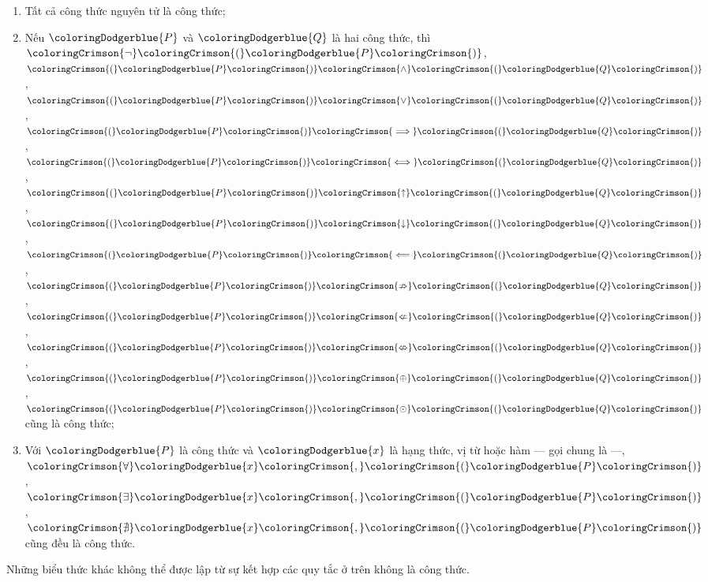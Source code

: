 \begin{enumerate}
   \item Tất cả công thức nguyên tử là công thức;
   \item Nếu $\coloringDodgerblue{P}$ và $\coloringDodgerblue{Q}$ là hai công thức, thì 
      $\coloringCrimson{\neg}\coloringCrimson{(}\coloringDodgerblue{P}\coloringCrimson{)}$, 
      $\coloringCrimson{(}\coloringDodgerblue{P}\coloringCrimson{)} \coloringCrimson{\land} \coloringCrimson{(}\coloringDodgerblue{Q}\coloringCrimson{)}$, 
      $\coloringCrimson{(}\coloringDodgerblue{P}\coloringCrimson{)} \coloringCrimson{\lor} \coloringCrimson{(}\coloringDodgerblue{Q}\coloringCrimson{)}$, 
      $\coloringCrimson{(}\coloringDodgerblue{P}\coloringCrimson{)} \coloringCrimson{\implies} \coloringCrimson{(}\coloringDodgerblue{Q}\coloringCrimson{)}$, 
      $\coloringCrimson{(}\coloringDodgerblue{P}\coloringCrimson{)} \coloringCrimson{\iff} \coloringCrimson{(}\coloringDodgerblue{Q}\coloringCrimson{)}$, 
      $\coloringCrimson{(}\coloringDodgerblue{P}\coloringCrimson{)} \coloringCrimson{\uparrow} \coloringCrimson{(}\coloringDodgerblue{Q}\coloringCrimson{)}$, 
      $\coloringCrimson{(}\coloringDodgerblue{P}\coloringCrimson{)} \coloringCrimson{\downarrow} \coloringCrimson{(}\coloringDodgerblue{Q}\coloringCrimson{)}$, 
      $\coloringCrimson{(}\coloringDodgerblue{P}\coloringCrimson{)} \coloringCrimson{\impliedby} \coloringCrimson{(}\coloringDodgerblue{Q}\coloringCrimson{)}$, 
      $\coloringCrimson{(}\coloringDodgerblue{P}\coloringCrimson{)} \coloringCrimson{\nRightarrow} \coloringCrimson{(}\coloringDodgerblue{Q}\coloringCrimson{)}$, 
      $\coloringCrimson{(}\coloringDodgerblue{P}\coloringCrimson{)} \coloringCrimson{\nLeftarrow} \coloringCrimson{(}\coloringDodgerblue{Q}\coloringCrimson{)}$, 
      $\coloringCrimson{(}\coloringDodgerblue{P}\coloringCrimson{)} \coloringCrimson{\nLeftrightarrow} \coloringCrimson{(}\coloringDodgerblue{Q}\coloringCrimson{)}$, 
      $\coloringCrimson{(}\coloringDodgerblue{P}\coloringCrimson{)} \coloringCrimson{\oplus} \coloringCrimson{(}\coloringDodgerblue{Q}\coloringCrimson{)}$, 
      $\coloringCrimson{(}\coloringDodgerblue{P}\coloringCrimson{)} \coloringCrimson{\odot} \coloringCrimson{(}\coloringDodgerblue{Q}\coloringCrimson{)}$ cũng là công thức;

   \item Với $\coloringDodgerblue{P}$ là công thức và $\coloringDodgerblue{x}$ là hạng thức, vị từ hoặc hàm --- gọi chung là  ---, 
      $\coloringCrimson{\forall}\coloringDodgerblue{x}\coloringCrimson{,} \coloringCrimson{(}\coloringDodgerblue{P}\coloringCrimson{)}$, 
      $\coloringCrimson{\exists}\coloringDodgerblue{x}\coloringCrimson{,} \coloringCrimson{(}\coloringDodgerblue{P}\coloringCrimson{)}$, 
      $\coloringCrimson{\nexists}\coloringDodgerblue{x}\coloringCrimson{,} \coloringCrimson{(}\coloringDodgerblue{P}\coloringCrimson{)}$ cũng đều là công thức.
\end{enumerate}
Những biểu thức khác không thể được lập từ sự kết hợp các quy tắc ở trên không là công thức.

